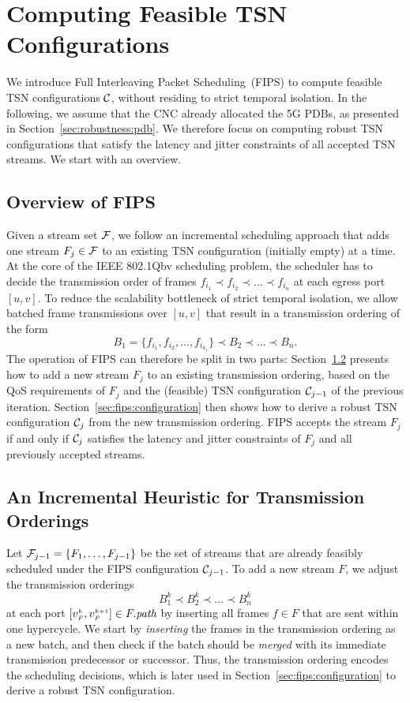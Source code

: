 \section{Computing Feasible TSN Configurations} \label{sec:fips}
We introduce Full Interleaving Packet Scheduling~(FIPS) to compute feasible TSN configurations $\Conf$, without residing to strict temporal isolation.
In the following, we assume that the CNC already allocated the 5G PDBs, as presented in Section~\ref{sec:robustness:pdb}.
We therefore focus on computing robust TSN configurations that satisfy the latency and jitter constraints of all accepted TSN streams.
We start with an overview.

\subsection{Overview of FIPS}
Given a stream set $\TT$, we follow an incremental scheduling approach that adds one stream $F_j \in \TT$ to an existing TSN configuration (initially empty) at a time.
At the core of the IEEE 802.1Qbv scheduling problem, the scheduler has to decide the transmission order of frames $f_{i_1} \prec f_{i_2} \prec \ldots \prec f_{i_n}$ at each egress port~$[u,v]$.
To reduce the scalability bottleneck of strict temporal isolation, we allow batched frame transmissions over $[u,v]$ that result in a transmission ordering of the form
\begin{equation*}
  B_1 = \{f_{i_1}, f_{i_2}, \ldots, f_{i_{k_1}}\} \prec B_2 \prec \ldots \prec B_n.
\end{equation*}
The operation of FIPS can therefore be split in two parts:
Section~\ref{sec:fips:incremental} presents how to add a new stream $F_j$ to an existing transmission ordering, based on the QoS requirements of $F_j$ and the (feasible) TSN configuration $\Conf_{j-1}$ of the previous iteration.
Section~\ref{sec:fips:configuration} then shows how to derive a robust TSN configuration $\Conf_j$ from the new transmission ordering.
FIPS accepts the stream $F_j$ if and only if $\Conf_j$ satisfies the latency and jitter constraints of $F_j$ and all previously accepted streams.

\subsection{An Incremental Heuristic for Transmission Orderings} \label{sec:fips:incremental}
Let $\TT_{j-1} = \{F_1, \ldots, F_{j-1}\}$ be the set of streams that are already feasibly scheduled under the FIPS configuration $\Conf_{j-1}$.
To add a new stream $F$, we adjust the transmission orderings
\begin{equation*}
  B_1^k \prec B_2^k \prec \ldots \prec B_n^k
\end{equation*}
at each port $[\v{k}{F}, \v{k+1}{F}] \in \path{F}$ by inserting all frames $f \in F$ that are sent within one hypercycle.
We start by \textit{inserting} the frames in the transmission ordering as a new batch, and then check if the batch should be \textit{merged} with its immediate transmission predecessor or successor. 
Thus, the transmission ordering encodes the scheduling decisions, which is later used in Section~\ref{sec:fips:configuration} to derive a robust TSN configuration.

